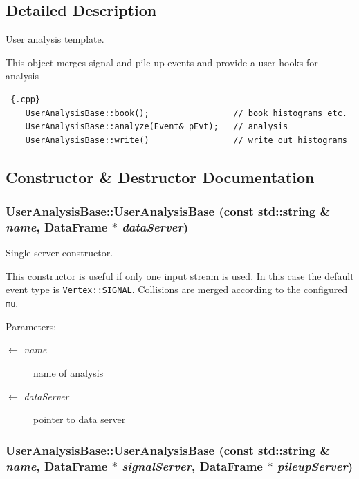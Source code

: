 \subsection{Detailed Description}
User analysis template. 

This object merges signal and pile-up events and provide a user hooks for analysis 

\begin{Code}\begin{verbatim} {.cpp}
    UserAnalysisBase::book();                 // book histograms etc.
    UserAnalysisBase::analyze(Event& pEvt);   // analysis
    UserAnalysisBase::write()                 // write out histograms
\end{verbatim}\end{Code}

 



\subsection{Constructor \& Destructor Documentation}
\hypertarget{classUserAnalysisBase_3cc225ef8241f14310873e72d9960078}{
\subsubsection[UserAnalysisBase]{\setlength{\rightskip}{0pt plus 5cm}User\-Analysis\-Base::User\-Analysis\-Base (const std::string \& {\em name}, Data\-Frame $\ast$ {\em data\-Server})}}
\label{classUserAnalysisBase_3cc225ef8241f14310873e72d9960078}


Single server constructor. 

This constructor is useful if only one input stream is used. In this case the default event type is {\tt Vertex::SIGNAL}. Collisions are merged according to the configured {\tt mu}.

\begin{Desc}
\item[Parameters:]
\begin{description}
\item[\mbox{$\leftarrow$} {\em name}]name of analysis \item[\mbox{$\leftarrow$} {\em data\-Server}]pointer to data server \end{description}
\end{Desc}
\hypertarget{classUserAnalysisBase_e1e2ecf9f0a86b33e6ce10e1323763dd}{
\subsubsection[UserAnalysisBase]{\setlength{\rightskip}{0pt plus 5cm}User\-Analysis\-Base::User\-Analysis\-Base (const std::string \& {\em name}, Data\-Frame $\ast$ {\em signal\-Server}, Data\-Frame $\ast$ {\em pileup\-Server})}}
\label{classUserAnalysisBase_e1e2ecf9f0a86b33e6ce10e1323763dd}


